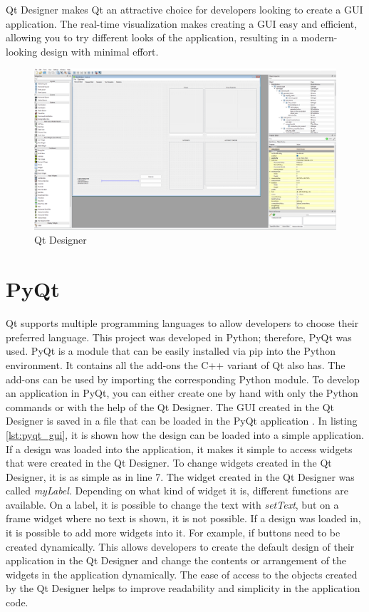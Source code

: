 Qt Designer makes Qt an attractive choice for developers looking to create a GUI application. The real-time visualization makes creating a GUI easy and efficient, allowing you to try different looks of the application, resulting in a modern-looking design with minimal effort.

\begin{figure}
    \centering
    \includegraphics[width=0.8\linewidth]{images/qt_designer.png}
    \caption{Qt Designer}
    \label{fig:qt_designer}
\end{figure}

\section{PyQt}
\label{sub:pyqt}


Qt supports multiple programming languages to allow developers to choose their preferred language. This project was developed in Python; therefore, PyQt was used. PyQt is a module that can be easily installed via pip into the Python environment. It contains all the add-ons the C++ variant of Qt also has. The add-ons can be used by importing the corresponding Python module. To develop an application in PyQt, you can either create one by hand with only the Python commands or with the help of the Qt Designer. The GUI created in the Qt Designer is saved in a file that can be loaded in the PyQt application \cite{pyqt}. In listing \ref{lst:pyqt_gui}, it is shown how the design can be loaded into a simple application. If a design was loaded into the application, it makes it simple to access widgets that were created in the Qt Designer. To change widgets created in the Qt Designer, it is as simple as in line 7. The widget created in the Qt Designer was called \textit{myLabel}. Depending on what kind of widget it is, different functions are available. On a label, it is possible to change the text with \textit{setText}, but on a frame widget where no text is shown, it is not possible. If a design was loaded in, it is possible to add more widgets into it. For example, if buttons need to be created dynamically. This allows developers to create the default design of their application in the Qt Designer and change the contents or arrangement of the widgets in the application dynamically. The ease of access to the objects created by the Qt Designer helps to improve readability and simplicity in the application code.

